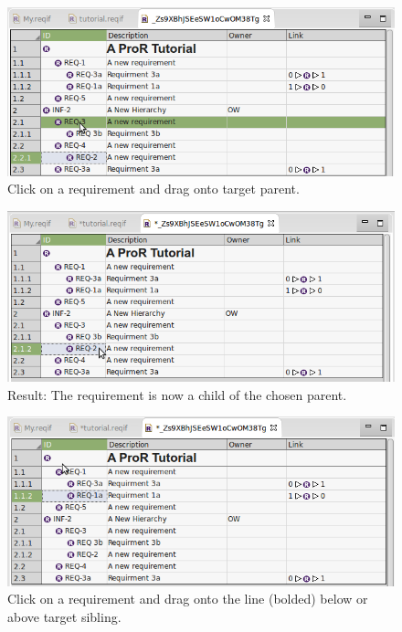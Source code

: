 {{{\begin{figure}[H]
  \centering
  \includegraphics[width=\linewidth]{../rmf-images/hierarchy_step_1.png}
  \caption{Click on a requirement and drag onto target parent.}
  \label{fig:hierarchy_step_1}
\end{figure}
\begin{figure}[H]
  \centering
  \includegraphics[width=\linewidth]{../rmf-images/hierarchy_step_2.png}
  \caption{Result: The requirement is now a child of the chosen parent.}
  \label{fig:hierarchy_step_2}
\end{figure}
\begin{figure}[H]
  \centering
  \includegraphics[width=\linewidth]{../rmf-images/hierarchy_step_3.png}
  \caption{Click on a requirement and drag onto the line (bolded) below or above target sibling.}
  \label{fig:hierarchy_step_3}
\end{figure}
}}}
